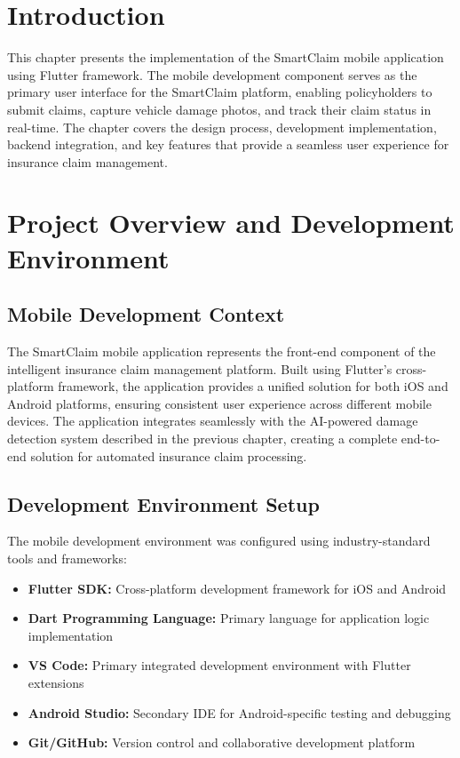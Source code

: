 \documentclass[12pt,a4paper]{report}
\begin{document}
\section{Introduction}

This chapter presents the implementation of the SmartClaim mobile application using Flutter framework. The mobile development component serves as the primary user interface for the SmartClaim platform, enabling policyholders to submit claims, capture vehicle damage photos, and track their claim status in real-time. The chapter covers the design process, development implementation, backend integration, and key features that provide a seamless user experience for insurance claim management.

\section{Project Overview and Development Environment}

\subsection{Mobile Development Context}

The SmartClaim mobile application represents the front-end component of the intelligent insurance claim management platform. Built using Flutter's cross-platform framework, the application provides a unified solution for both iOS and Android platforms, ensuring consistent user experience across different mobile devices. The application integrates seamlessly with the AI-powered damage detection system described in the previous chapter, creating a complete end-to-end solution for automated insurance claim processing.

\subsection{Development Environment Setup}

The mobile development environment was configured using industry-standard tools and frameworks:

\begin{itemize}
    \item \textbf{Flutter SDK:} Cross-platform development framework for iOS and Android
    \item \textbf{Dart Programming Language:} Primary language for application logic implementation
    \item \textbf{VS Code:} Primary integrated development environment with Flutter extensions
    \item \textbf{Android Studio:} Secondary IDE for Android-specific testing and debugging
    \item \textbf{Git/GitHub:} Version control and collaborative development platform
\end{itemize}
\end{document}
